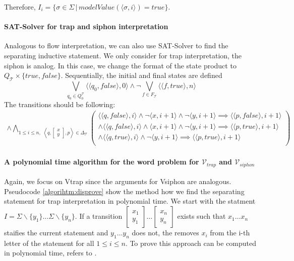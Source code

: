 Therefore, $I_i = \{ \sigma \in \Sigma \, | \, modelValue(\langle \sigma, i \rangle) = true\}$.

\paragraph*{SAT-Solver for trap and siphon interpretation}
Analogous to flow interpretation, we can also use SAT-Solver to find the 
separating inductive statement. We only consider for trap interpretation, the 
siphon is analog.
In this case, we change the format of the state product to 
$Q_{\mathcal{T}} \times \{true, false\}$. 
Sequentially, the initial and final states are defined 
\begin{equation*}
    \bigvee_{q_0 \in Q_0^{\mathcal{T}}} \langle \langle q_0, false\rangle , 0 \rangle \wedge \lnot \bigvee_{f \in F_{\mathcal{T}}} \langle \langle f,true \rangle,n \rangle
\end{equation*}
The transitions should be following:
\begin{multline}
    \wedge \bigwedge_{1 \leq i \leq n, \,\, \left\langle q, \left[\substack{x \\ y}\right],p \right\rangle \in \Delta_{\mathcal{T}}}
    \begin{pmatrix}
        \langle \langle q,false \rangle,i \rangle \wedge \lnot \langle x, i+1 \rangle \wedge \lnot \langle y, i+1 \rangle \implies \langle \langle p,false \rangle,i+1 \rangle \\
        \wedge \langle \langle q,false \rangle,i \rangle \wedge \langle x, i+1 \rangle \wedge \lnot \langle y, i+1 \rangle \implies \langle \langle p,true \rangle,i+1 \rangle \\
        \wedge \langle \langle q,true \rangle,i \rangle \wedge \lnot \langle y, i+1 \rangle \implies \langle \langle p,true \rangle,i+1 \rangle \\
    \end{pmatrix}
\end{multline}

\paragraph{A polynomial time algorithm for the word problem for $\mathcal{V}_{trap}$ and $\mathcal{V}_{siphon}$}
Again, we focus on Vtrap since the arguments for Vsiphon are analogous.
Pseudocode \ref{algorihtm:disprove} show the method how we find the separating 
statement for trap interpretation in polynomial time.
We start with the statment $I = \Sigma \backslash \{y_1\} \dots \Sigma \backslash \{y_n\}$.
If a transition $\left[\substack{x_1 \\ y_1}\right] \dots \left[\substack{x_n \\ y_n}\right]$ exists such that 
$x_1 \dots x_n$ staifies the current statement and $y_1 \dots y_n$ does not,
the removes  $x_i$ from the i-th letter of the statement for all $1 \leq i \leq n$.
To prove this approach can be computed in polynomial time, refers to \cite{latex}.

